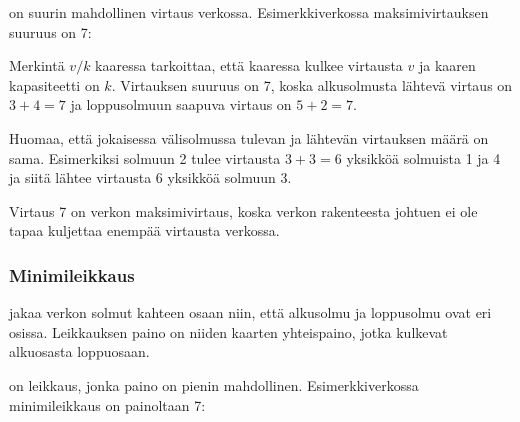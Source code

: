  on suurin
mahdollinen virtaus verkossa.
Esimerkkiverkossa maksimivirtauksen suuruus on 7:

\begin{center}
\end{center}

Merkintä $v/k$ kaaressa tarkoittaa,
että kaaressa kulkee virtausta $v$
ja kaaren kapasiteetti on $k$.
Virtauksen suuruus on 7, koska alkusolmusta
lähtevä virtaus on $3+4=7$ ja loppusolmuun
saapuva virtaus on $5+2=7$.

Huomaa, että jokaisessa välisolmussa tulevan ja
lähtevän virtauksen määrä on sama.
Esimerkiksi solmuun 2 tulee virtausta $3+3=6$ yksikköä solmuista 1 ja 4
ja siitä lähtee virtausta $6$ yksikköä solmuun 3.

Virtaus 7 on verkon maksimivirtaus, koska verkon
rakenteesta johtuen ei ole tapaa
kuljettaa enempää virtausta verkossa.

\subsubsection{Minimileikkaus}


 jakaa verkon solmut
kahteen osaan niin, että alkusolmu ja loppusolmu
ovat eri osissa.
Leikkauksen paino on niiden kaarten yhteispaino,
jotka kulkevat alkuosasta loppuosaan.

on leikkaus, jonka paino on pienin mahdollinen.
Esimerkkiverkossa minimileikkaus on painoltaan 7:

